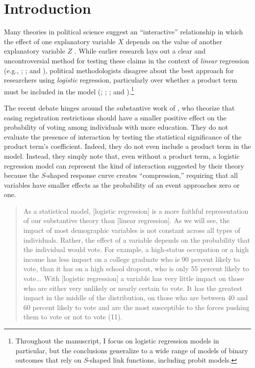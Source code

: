 \documentclass[12pt]{article}
\begin{document}
\section*{Introduction}

Many theories in political science suggest an ``interactive'' relationship in which the effect of one explanatory variable $X$ depends on the value of another explanatory variable $Z$ \citep{ClarkGilliganGolder2006, BerryGolderMilton2012}. While earlier research lays out a clear and uncontroversial method for testing these claims in the context of \textit{linear} regression (e.g., \citealt{KamFranzese2007}; \citealt{BramborClarkGolder2006}; and \citealt{Friedrich1982}), political methodologists disagree about the best approach for researchers using \textit{logistic} regression, particularly over whether a product term must be included in the model (\citealt{Nagler1991}; \citealt{Frant1991}; \citealt{BerryBerry1991}; and \citealt{BerryDeMerittEsarey2010}).\footnote{Throughout the manuscript, I focus on logistic regression models in particular, but the conclusions generalize to a wide range of models of binary outcomes that rely on \textit{S}-shaped link functions, including probit models.}  


The recent debate hinges around the substantive work of \cite{WolfingerRosenstone1980}, who theorize that easing registration restrictions should have a smaller positive effect on the probability of voting among individuals with more education. They do not evaluate the presence of interaction by testing the statistical significance of the product term's coefficient. Indeed, they do not even include a product term in the model. Instead, they simply note that, even without a product term, a logistic regression model can represent the kind of interaction suggested by their theory because the \textit{S}-shaped response curve creates ``compression,'' requiring that all variables have smaller effects as the probability of an event approaches zero or one. 

\begin{quote}\singlespace
As a statistical model, [logistic regression] is a more faithful representation of our substantive theory than [linear regression]. As we will see, the impact of most demographic variables is not constant across all types of individuals. Rather, the effect of a variable depends on the probability that the individual would vote. For example, a high-status occupation or a high income has less impact on a college graduate who is 90 percent likely to vote, than it has on a high school dropout, who is only 55 percent likely to vote... With [logistic regression] a variable has very little impact on those who are either very unlikely or nearly certain to vote. It has the greatest impact in the middle of the distribution, on those who are between 40 and 60 percent likely to vote and are the most susceptible to the forces pushing them to vote or not to vote (11).
\end{quote}
\end{document}

